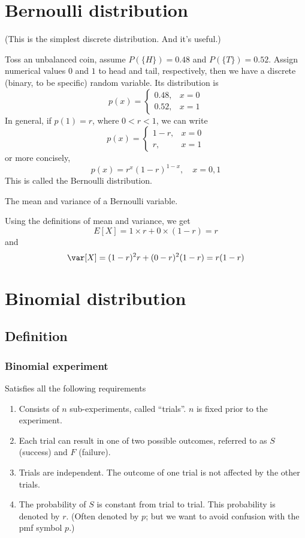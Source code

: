 \documentclass[12pt]{article}
\begin{document}
\section{Bernoulli distribution}

(This is the simplest discrete distribution. And it's useful.)

\example
    Toss an unbalanced coin,
    assume $P(\{H\}) = 0.48$ and $P(\{T\}) = 0.52$.
    Assign numerical values $0$ and $1$ to head and tail, respectively,
    then we have a discrete (binary, to be specific)
    random variable. Its distribution is
    \[
        p(x) = \begin{cases}
                    0.48, & x = 0\\
                    0.52, & x = 1
                \end{cases}
    \]
    In general, if $p(1) = r$, where $0 < r < 1$, we can write
    \[
        p(x) = \begin{cases}
                    1 - r, & x = 0\\
                    r, & x = 1
                \end{cases}
    \]
    or more concisely,
    \[
        p(x) = r^x (1-r)^{1-x},\quad x=0,1
    \]
    This is called the Bernoulli distribution.

\example The mean and variance of a Bernoulli variable.

Using the definitions of mean and variance, we get
\[
E[X] = 1\times r + 0\times (1-r) = r
\]
and
\[
\var[X] = (1 - r)^2 r + (0 - r)^2 (1-r) = r(1-r)
\]

\section{Binomial distribution}

\subsection{Definition}

\subsubsection{Binomial experiment}

Satisfies all the following requirements
\begin{enumerate}
\item Consists of $n$ sub-experiments, called ``trials''.
    $n$ is fixed prior to the experiment.
\item Each trial can result in one of two possible outcomes,
    referred to as $S$ (success) and $F$ (failure).

\item Trials are independent. The outcome of one trial is not affected
by the other trials.
\item The probability of $S$ is constant from trial to trial.
    This probability is denoted by $r$.
    (Often denoted by $p$; but we want to avoid confusion with
    the pmf symbol $p$.)
\end{enumerate}
\end{document}
